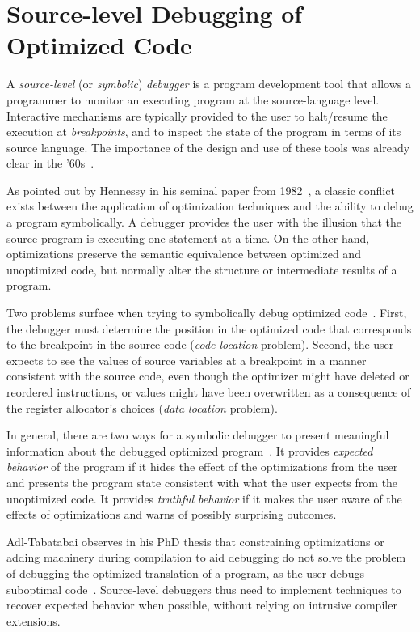 \section{Source-level Debugging of Optimized Code}
A {\em source-level} (or {\em symbolic}) {\em debugger} is a program development tool that allows a programmer to monitor an executing program at the source-language level. Interactive mechanisms are typically provided to the user to halt/resume the execution at {\em breakpoints}, and to inspect the state of the program in terms of its source language. The importance of the design and use of these tools was already clear in the '60s~\cite{Evans66}.

\missing %

As pointed out by Hennessy in his seminal paper from 1982~\cite{Hennessy82}, a classic conflict exists between the application of optimization techniques and the ability to debug a program symbolically. A debugger provides the user with the illusion that the source program is executing one statement at a time. On the other hand, optimizations preserve the semantic equivalence between optimized and unoptimized code, but normally alter the structure or intermediate results of a program.

Two problems surface when trying to symbolically debug optimized code~\cite{Adl-Tabatabai96,Jaramillo00}. First, the debugger must determine the position in the optimized code that corresponds to the breakpoint in the source code ({\em code location} problem). Second, the user expects to see the values of source variables at a breakpoint in a manner consistent with the source code, even though the optimizer might have 
deleted or reordered instructions, or values might have been overwritten as a consequence of the register allocator's choices ({\em data location} problem).

In general, there are two ways for a symbolic debugger to present meaningful information about the debugged optimized program~\cite{Wu99}. It provides {\em expected behavior} of the program if it hides the effect of the optimizations from the user and presents the program state consistent with what the user expects from the unoptimized code. It provides {\em truthful behavior} if it makes the user aware of the effects of optimizations and warns of possibly surprising outcomes.

Adl-Tabatabai observes in his PhD thesis that constraining optimizations or adding machinery during compilation to aid debugging do not solve the problem of debugging the optimized translation of a program, as the user debugs suboptimal code~\cite{Adl-Tabatabai96thesis}. Source-level debuggers thus need to implement techniques to recover expected behavior when possible, without relying on intrusive compiler extensions.

